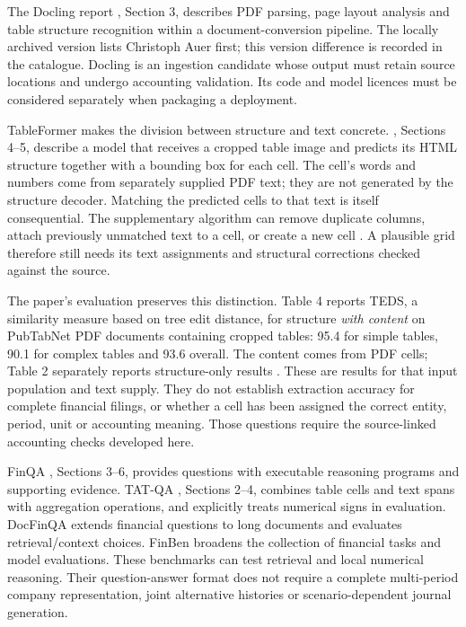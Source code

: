The Docling report \citep{nassar2024}, Section 3, describes PDF parsing, page
layout analysis and table structure recognition within a document-conversion
pipeline. The locally archived version lists Christoph Auer first; this
version difference is recorded in the catalogue. Docling is an ingestion
candidate whose output must retain source locations and undergo accounting
validation. Its code and model licences must be considered separately when
packaging a deployment.

\enlargethispage{\baselineskip}
TableFormer makes the division between structure and text concrete.
\citet{nassar2022tableformer}, Sections 4--5, describe a model that receives a
cropped table image and predicts its HTML structure together with a bounding
box for each cell. The cell's words and numbers come from separately supplied
PDF text; they are not generated by the structure decoder. Matching the
predicted cells to that text is itself consequential. The supplementary
algorithm can remove duplicate columns, attach previously unmatched text to a
cell, or create a new cell \citep[Section 2]{nassar2022tableformersupp}. A
plausible grid therefore still needs its text assignments and structural
corrections checked against the source.

The paper's evaluation preserves this distinction. Table 4 reports TEDS,
a similarity measure based on tree edit distance, for structure \emph{with
content} on PubTabNet PDF documents containing cropped tables: 95.4 for simple
tables, 90.1 for complex tables and 93.6 overall. The content comes from PDF
cells; Table 2 separately reports structure-only results
\citep[Tables 2 and 4, p.~4620]{nassar2022tableformer}. These are results for
that input population and text supply. They do not establish extraction
accuracy for complete financial filings, or whether a cell has been assigned
the correct entity, period, unit or accounting meaning. Those questions require
the source-linked accounting checks developed here.


FinQA \citep{chen2021}, Sections 3--6, provides questions with executable
reasoning programs and supporting evidence. TAT-QA \citep{zhu2021}, Sections
2--4, combines table cells and text spans with aggregation operations, and
explicitly treats numerical signs in evaluation. DocFinQA \citep{reddy2024}
extends financial questions to long documents and evaluates retrieval/context
choices. FinBen \citep{xie2024} broadens the collection of financial tasks and
model evaluations. These benchmarks can test retrieval and local numerical
reasoning. Their question-answer format does not require a complete
multi-period company representation, joint alternative histories or
scenario-dependent journal generation.


